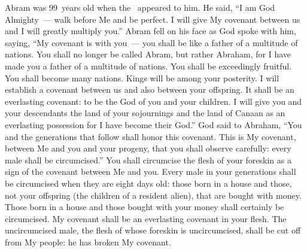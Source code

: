
\begin{inparaenum}
   Abram was 99~years old when the \lord\ appeared to him. He said, ``I am God Almighty~--- walk before Me and be perfect.%
   I will give My covenant between us and I will greatly multiply you.''%
   Abram fell on his face as God spoke with him, saying,%
   ``My covenant is with you~--- you shall be like a father of a multitude of nations.%
   You shall no longer be called Abram, but rather Abraham, for I have made you a father of a multitude of nations.%
   You shall be exceedingly fruitful. You shall become many nations. Kings will be among your posterity.%
   I will establish a covenant between us and also between your offspring. It shall be an everlasting covenant: to be the God of you and your children.%
   I will give you and your descendants the land of your sojournings and the land of Canaan as an everlasting possession for I have become their God.''%
   God said to Abraham, ``You and the generations that follow shall honor this covenant.%
   This is My covenant, between Me and you and your progeny, that you shall observe carefully: every male shall be circumcised.''%
   You shall circumcise the flesh of your foreskin as a sign of the covenant between Me and you.%
   Every male in your generations shall be circumcised when they are eight days old: those born in a house and those, not your offspring (the children of a resident alien), that are bought with money.%
   Those born in a house and those bought with your money shall certainly be circumcised. My covenant shall be an everlasting covenant in your flesh.%
   The uncircumcised male, the flesh of whose foreskin is uncircumcised, shall be cut off from My people: he has broken My covenant.%


\end{inparaenum}
